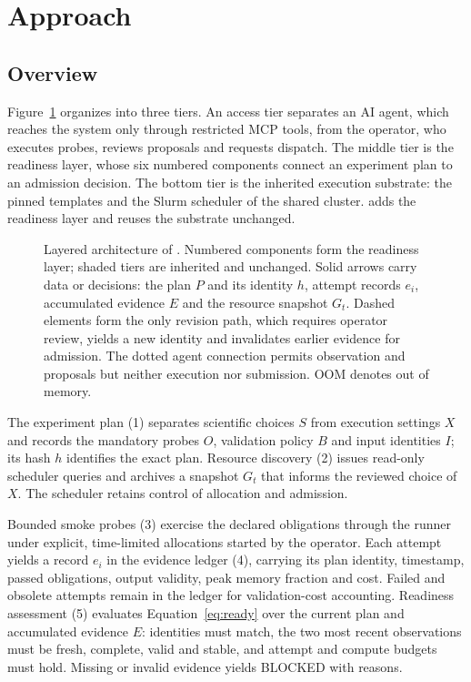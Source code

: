 \section{Approach}\label{sec:approach}
\subsection{Overview}\label{sec:approach-overview}
Figure~\ref{fig:approach-overview} organizes \tool{} into three tiers. An access tier separates an AI agent, which reaches the system only through restricted MCP tools, from the operator, who executes probes, reviews proposals and requests dispatch. The middle tier is the \tool{} readiness layer, whose six numbered components connect an experiment plan to an admission decision. The bottom tier is the inherited execution substrate: the pinned \upstream{} templates and the Slurm scheduler of the shared cluster. \tool{} adds the readiness layer and reuses the substrate unchanged.

\begin{figure}[t]
\centering

\caption{Layered architecture of \tool{}. Numbered components form the readiness layer; shaded tiers are inherited and unchanged. Solid arrows carry data or decisions: the plan $P$ and its identity $h$, attempt records $e_i$, accumulated evidence $E$ and the resource snapshot $G_t$. Dashed elements form the only revision path, which requires operator review, yields a new identity and invalidates earlier evidence for admission. The dotted agent connection permits observation and proposals but neither execution nor submission. OOM denotes out of memory.}\label{fig:approach-overview}
\end{figure}

The experiment plan (1) separates scientific choices $S$ from execution settings $X$ and records the mandatory probes $O$, validation policy $B$ and input identities $I$; its hash $h$ identifies the exact plan. Resource discovery (2) issues read-only scheduler queries and archives a snapshot $G_t$ that informs the reviewed choice of $X$. The scheduler retains control of allocation and admission.

Bounded smoke probes (3) exercise the declared obligations through the \upstream{} runner under explicit, time-limited allocations started by the operator. Each attempt yields a record $e_i$ in the evidence ledger (4), carrying its plan identity, timestamp, passed obligations, output validity, peak memory fraction and cost. Failed and obsolete attempts remain in the ledger for validation-cost accounting. Readiness assessment (5) evaluates Equation~\eqref{eq:ready} over the current plan and accumulated evidence $E$: identities must match, the two most recent observations must be fresh, complete, valid and stable, and attempt and compute budgets must hold. Missing or invalid evidence yields BLOCKED with reasons.

